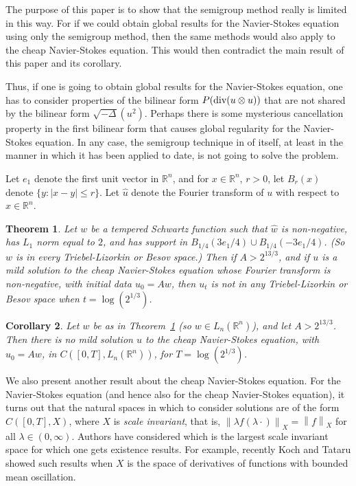 \documentclass[12pt]{article}
\newtheorem{thm}{Theorem}
\newtheorem{cor}[thm]{Corollary}
\newcommand{\R}{{\mathbb R}}
\newcommand{\modo}[1]{{\left|#1\right|}}
\newcommand{\normo}[1]{{\left\|#1\right\|}}
\renewcommand{\div}{\text{\rm div}}
\begin{document}
The purpose of this paper is to show that the semigroup method really is
limited in this way.  For if we could obtain
global results for the Navier-Stokes equation using only the semigroup
method, then the same methods would also
apply to the cheap Navier-Stokes equation.
This would then contradict the main result of this paper and its corollary.

Thus, if one is going to obtain global results for the Navier-Stokes
equation, one has to consider properties of the bilinear form
$P(\div(u \otimes u))$ that are not shared by the bilinear form
$\sqrt{-\Delta} (u^2)$.  Perhaps there is some mysterious cancellation
property in the first bilinear form that causes global regularity for
the Navier-Stokes equation.  In any case, the semigroup technique in
of itself, at least in the manner in which it has been applied to date,
is not going to solve the problem.

Let $e_1$ denote the first unit vector in $\R^n$, and for $x \in \R^n$,
$r>0$, let $B_r(x)$ denote $\{y:\modo{x-y}\le r\}$.
Let $\hat u$ denote the Fourier transform of $u$ with
respect to $x\in\R^n$.  

\begin{thm}
\label{blow-up}
Let $w$ be a tempered Schwartz function such that $\hat w$
is non-negative, has $L_1$ norm equal to $2$, and has support in 
$B_{1/4}(3e_1/4) \cup B_{1/4}(-3e_1/4)$.  (So $w$ is in every
Triebel-Lizorkin or Besov space.)
Then if $A > 2^{13/3}$, and if $u$ is a mild solution
to the cheap Navier-Stokes equation
whose Fourier transform is non-negative, with initial data $u_0 = A w$, 
then $u_t$
is not in any Triebel-Lizorkin or Besov space when $t = \log(2^{1/3})$.
\end{thm}

\begin{cor}
\label{no-Ln}
Let $w$ be as in Theorem~\ref{blow-up} (so $w \in L_n(\R^n)$), and let
$A > 2^{13/3}$.  Then there is 
no mild solution $u$ to the cheap 
Navier-Stokes equation, with $u_0=Aw$,
in $C([0,T],L_n(\R^n))$, for $T = \log(2^{1/3})$.
\end{cor}

We also present another result about the 
cheap Navier-Stokes
equation.  For the Navier-Stokes equation (and hence also for the
cheap Navier-Stokes equation), it turns out that the natural spaces
in which to consider solutions are of the form $C([0,T],X)$, where $X$
is {\em scale invariant}, that is,
$ \normo{\lambda f(\lambda \cdot)}_X = \normo f_X $
for all $\lambda \in (0,\infty)$.
Authors have considered which is the
largest scale invariant space for which one gets existence
results.  For example, recently Koch and Tataru \cite{KT} showed such
results when $X$ is the space of derivatives of functions with
bounded mean oscillation.
\end{document}
